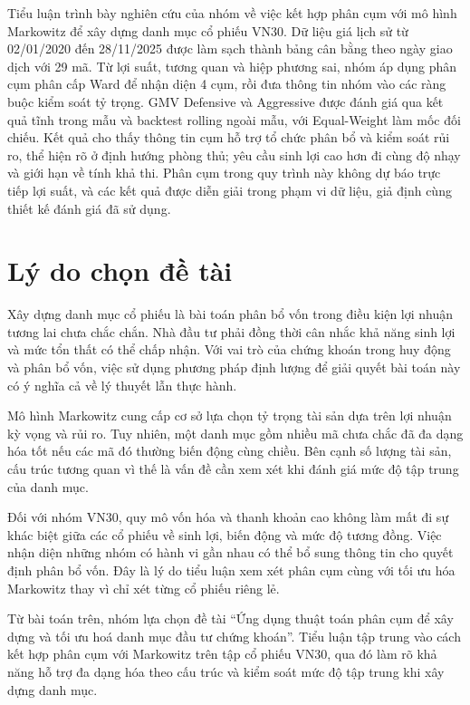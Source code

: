 \documentclass[12pt,a4paper,openany,oneside]{book}
\begin{document}
\listoffigures
\label{Toc227188407}
\listoftables
\label{Toc227188408}

\label{Toc227188409}
Tiểu luận trình bày nghiên cứu của nhóm về việc kết hợp phân cụm với mô hình Markowitz để xây dựng danh mục cổ phiếu VN30. Dữ liệu giá lịch sử từ 02/01/2020 đến 28/11/2025 được làm sạch thành bảng cân bằng theo ngày giao dịch với 29 mã. Từ lợi suất, tương quan và hiệp phương sai, nhóm áp dụng phân cụm phân cấp Ward để nhận diện 4 cụm, rồi đưa thông tin nhóm vào các ràng buộc kiểm soát tỷ trọng. GMV Defensive và Aggressive được đánh giá qua kết quả tĩnh trong mẫu và backtest rolling ngoài mẫu, với Equal-Weight làm mốc đối chiếu. Kết quả cho thấy thông tin cụm hỗ trợ tổ chức phân bổ và kiểm soát rủi ro, thể hiện rõ ở định hướng phòng thủ; yêu cầu sinh lợi cao hơn đi cùng độ nhạy và giới hạn về tính khả thi. Phân cụm trong quy trình này không dự báo trực tiếp lợi suất, và các kết quả được diễn giải trong phạm vi dữ liệu, giả định cùng thiết kế đánh giá đã sử dụng.

\mainmatter
{}\label{Toc227188410}
\section{Lý do chọn đề tài}\label{Toc227188411}
Xây dựng danh mục cổ phiếu là bài toán phân bổ vốn trong điều kiện lợi nhuận tương lai chưa chắc chắn. Nhà đầu tư phải đồng thời cân nhắc khả năng sinh lợi và mức tổn thất có thể chấp nhận. Với vai trò của chứng khoán trong huy động và phân bổ vốn, việc sử dụng phương pháp định lượng để giải quyết bài toán này có ý nghĩa cả về lý thuyết lẫn thực hành.

Mô hình Markowitz cung cấp cơ sở lựa chọn tỷ trọng tài sản dựa trên lợi nhuận kỳ vọng và rủi ro. Tuy nhiên, một danh mục gồm nhiều mã chưa chắc đã đa dạng hóa tốt nếu các mã đó thường biến động cùng chiều. Bên cạnh số lượng tài sản, cấu trúc tương quan vì thế là vấn đề cần xem xét khi đánh giá mức độ tập trung của danh mục.

Đối với nhóm VN30, quy mô vốn hóa và thanh khoản cao không làm mất đi sự khác biệt giữa các cổ phiếu về sinh lợi, biến động và mức độ tương đồng. Việc nhận diện những nhóm có hành vi gần nhau có thể bổ sung thông tin cho quyết định phân bổ vốn. Đây là lý do tiểu luận xem xét phân cụm cùng với tối ưu hóa Markowitz thay vì chỉ xét từng cổ phiếu riêng lẻ.

Từ bài toán trên, nhóm lựa chọn đề tài “Ứng dụng thuật toán phân cụm để xây dựng và tối ưu hoá danh mục đầu tư chứng khoán”. Tiểu luận tập trung vào cách kết hợp phân cụm với Markowitz trên tập cổ phiếu VN30, qua đó làm rõ khả năng hỗ trợ đa dạng hóa theo cấu trúc và kiểm soát mức độ tập trung khi xây dựng danh mục.
\end{document}
